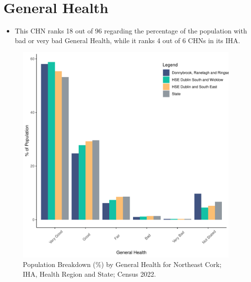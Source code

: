 \documentclass{article}
\begin{document}
\pagebreak

\section{General Health}\label{sect:GenHealth}
\begin{itemize}
\item  This CHN ranks  18 out of 96 regarding the percentage of the population with bad or very bad General Health, while it ranks   4 out of 6 CHNs in its IHA.
\end{itemize}
\begin{figure}[h]
	\centering
	\includegraphics[width = 150mm]{../figures/GenED.pdf}
	\caption{Population Breakdown (\%) by General Health for Northeast Cork; IHA, Health Region and State;  Census 2022.}
	\label{fig:2ae19629-1a6a-13a3-e055-000000000001}
	\end{figure}
\end{document}
